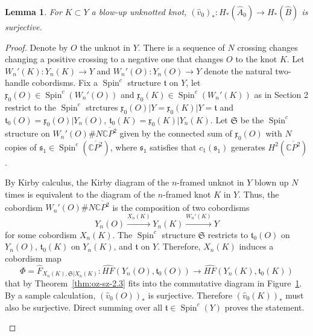 \documentclass{article}
\newtheorem{lemma}[equation]{Lemma}
\theoremstyle{remark}
\numberwithin{equation}{section}
\numberwithin{table}{section}
\newcommand{\wh}{\widehat}
\renewcommand{\frak}{\mathfrak}
\DeclareMathOperator{\Spin}{Spin}
\renewcommand{\(}{\left(}
\renewcommand{\)}{\right)}
\newcommand{\C}{{\mathbb{C}}}
\begin{document}
\begin{lemma}\label{lem:rank-a-b}
For $K\subset Y$ a blow-up unknotted knot, $(\wh v_0)_*:H_*(\wh A_0)\to H_*(\wh B)$ is surjective.
\end{lemma}
\begin{proof}
Denote by $O$ the unknot in $Y$. There is a sequence of $N$ crossing changes changing a positive crossing to a negative one that changes $O$ to the knot $K$. Let $W_n'(K):Y_n(K)\to Y$ and $W_n'(O):Y_n(O)\to Y$ denote the natural two-handle cobordisms. Fix a $\Spin^c$ structure $\frak t$ on $Y$, let $\frak x_0(O)\in\Spin^c(W_n'(O))$ and $\frak x_0(K)\in\Spin^c(W_n'(K))$ as in Section 2 restrict to the $\Spin^c$ strctures $\frak x_0(O)\vert Y=\frak x_0(K)\vert Y=\frak t$ and $\frak t_0(O)=\frak x_0(O)\vert Y_n(O)$, $\frak t_0(K)=\frak x_0(K)\vert Y_n(K)$. Let $\frak S$ be the $\Spin^c$ structure on $W_n'(O)\# N\overline{\C P^2}$ given by the connected sum of $\frak x_0(O)$ with $N$ copies of $\frak s_1\in\Spin^c(\overline{\C P^2})$, where $\frak s_1$ satisfies that $c_1(\frak s_1)$ generates $H^2(\overline{\C P^2})$. 

By Kirby calculus, the Kirby diagram of the $n$-framed unknot in $Y$ blown up $N$ times is equivalent to the diagram of the $n$-framed knot $K$ in $Y$. Thus, the cobordism $W_n'(O)\# N\overline{\C P^2}$ is the composition of two cobordisms
$$Y_n(O)\xrightarrow{X_n(K)}Y_n(K)\xrightarrow{W_n'(K)}Y$$ for some cobordism $X_n(K)$. The $\Spin^c$ structure $\frak S$ restricts to $\frak t_0(O)$ on $Y_n(O)$, $\frak t_0(K)$ on $Y_n(K)$, and $\frak t$ on $Y$. Therefore, $X_n(K)$ induces a cobordism map 
$$\Phi=\wh F_{X_n(K),\frak S\vert X_n(K)}:\wh{HF}(Y_n(O),\frak t_0(O))\to\wh{HF}(Y_n(K),\frak t_0(K))$$ that by Theorem~\ref{thm:oz-sz-2.3} fits into the commutative diagram in Figure~\ref{fig:blow-up-unknotted}. By a sample calculation, $(\wh v_0(O))_*$ is surjective. Therefore $(\wh v_0(K))_*$ must also be surjective. Direct summing over all $\frak t\in\Spin^c(Y)$ proves the statement.

\begin{figure}[h]
\centering
{}
\caption{}
\label{fig:blow-up-unknotted}
\end{figure}


\end{proof}
\end{document}
